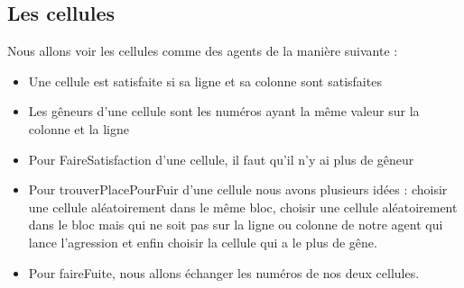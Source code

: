 	\subsection{Les cellules}
	Nous allons voir les cellules comme des agents de la manière suivante : 
	\begin{itemize}
	\item Une cellule est satisfaite si sa ligne et sa colonne sont satisfaites
	\item Les gêneurs d'une cellule sont les numéros ayant la même valeur sur la colonne et la ligne
	\item Pour FaireSatisfaction d'une cellule, il faut qu'il n'y ai plus de gêneur
	\item Pour trouverPlacePourFuir d'une cellule nous avons plusieurs idées : choisir une cellule aléatoirement dans le même bloc, choisir une cellule aléatoirement dans le bloc mais qui ne soit pas sur la ligne ou colonne de notre agent qui lance l'agression et enfin choisir la cellule qui a le plus de gêne.
	\item Pour faireFuite, nous allons échanger les numéros de nos deux cellules.
	\end{itemize}
